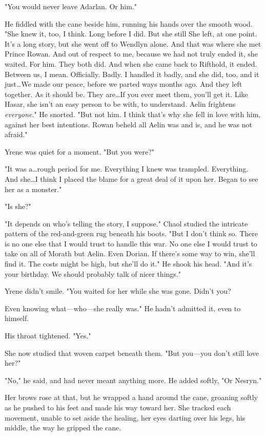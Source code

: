 "You would never leave Adarlan.
Or him."

He fiddled with the cane beside him, running his hands over the smooth wood.
"She knew it, too, I think.
Long before I did.
But she still  She left, at one point.
It's a long story, but she went off to Wendlyn alone.
And that was where she met Prince Rowan.
And out of respect to me, because we had not truly ended it, she waited.
For him.
They both did.
And when she came back to Rifthold, it ended.
Between us, I mean.
Officially.
Badly.
I handled it badly, and she did, too, and it just\ldots We made our peace, before we parted ways months ago.
And they left together.
As it should be.
They are\ldots If you ever meet them, you'll get it.
Like Hasar, she isn't an easy person to be with, to understand.
Aelin frightens \emph{everyone}."
He snorted.
"But not him.
I think that's why she fell in love with him, against her best intentions.
Rowan beheld all Aelin was and is, and he was not afraid."

Yrene was quiet for a moment.
"But you were?"

"It was a\ldots rough period for me.
Everything I knew was trampled.
Everything.
And she\ldots I think I placed the blame for a great deal of it upon her.
Began to see her as a monster."

"Is she?"

"It depends on who's telling the story, I suppose."
Chaol studied the intricate pattern of the red-and-green rug beneath his boots.
"But I don't think so.
There is no one else that I would trust to handle this war.
No one else I would trust to take on all of Morath but Aelin.
Even Dorian.
If there's some way to win, she'll find it.
The costs might be high, but she'll do it."
He shook his head.
"And it's your birthday.
We should probably talk of nicer things."

Yrene didn't smile.
"You waited for her while she was gone.
Didn't you?

Even knowing what---who---she really was."
He hadn't admitted it, even to himself.

His throat tightened.
"Yes."

She now studied that woven carpet beneath them.
"But you---you don't still love her?"

"No," he said, and had never meant anything more.
He added softly, "Or Nesryn."

Her brows rose at that, but he wrapped a hand around the cane, groaning softly as he pushed to his feet and made his way toward her.
She tracked each movement, unable to set aside the healing, her eyes darting over his legs, his middle, the way he gripped the cane.

